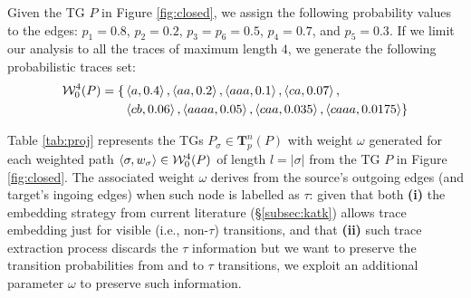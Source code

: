 \begin{example}\label{ex:neue}
Given the TG $P$ in Figure \ref{fig:closed}, we assign the following probability values to the edges: $p_1=0.8$, $p_2=0.2$, $p_3=p_6=0.5$, $p_4=0.7$, and $p_5=0.3$. If we limit our analysis to all the traces of maximum length $4$, we generate the following probabilistic traces set:
$$\begin{aligned}
\mathcal{W}^4_0(P)=\{&\braket{a,0.4},\braket{aa,0.2},\braket{aaa,0.1},\braket{ca,0.07},\\
&\braket{cb,0.06},\braket{aaaa,0.05},\braket{caa,0.035},\braket{caaa,0.0175}\}\\
\end{aligned}$$
\medskip

Table \ref{tab:proj} represents the TGs $P_\sigma\in\mathbf{T}_p^n(P)$ with weight $\omega$ generated for each weighted path $\braket{\sigma,w_\sigma}\in \mathcal{W}_0^4(P)$ of length $l=|\sigma|$ from the TG $P$ in Figure \ref{fig:closed}. The associated weight $\omega$ derives from the source's outgoing edges (and target's ingoing edges) when such node is labelled as $\tau$: given that both \textbf{(i)} the embedding strategy from current literature (\S\ref{subsec:katk}) allows trace embedding just for visible (i.e., non-$\tau$) transitions, and that \textbf{(ii)} such trace extraction process discards the $\tau$ information but we want to preserve the transition probabilities from and to $\tau$ transitions, we exploit an additional parameter $\omega$ to preserve such information.
\end{example}
	
